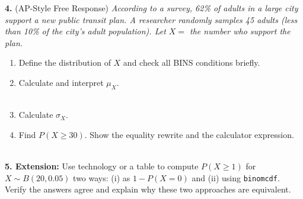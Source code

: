 \documentclass[10pt]{article}
\begin{document}
\begin{practicebox}
\tcbbreak
\vspace{8pt}
\textbf{4.} (AP-Style Free Response) \textit{According to a survey, 62\% of adults in
a large city support a new public transit plan. A researcher randomly samples
45 adults (less than 10\% of the city's adult population).
Let $X =$ the number who support the plan.}
\begin{enumerate}[label=(\alph*), leftmargin=2em, itemsep=8pt]
  \item Define the distribution of $X$ and check all BINS conditions briefly.\\
  \item Calculate and interpret $\mu_X$.\\
        \writeline\gradedhide{\hrulefill}\gradedright{\raisebox{-2pt}{\gradedblank[id=hw4b1, type=short, points=1, answer=27.9, check=numeric, tolerance=0.05]{1.3in}{0.2in}}}\\[6pt]
  \item Calculate $\sigma_X$.\\
        \writeline\gradedhide{\hrulefill}\gradedright{\raisebox{-2pt}{\gradedblank[id=hw4c, type=short, points=1, answer=3.26, check=numeric, tolerance=0.01]{1.3in}{0.2in}}}
  \item Find $P(X \ge 30)$. Show the equality rewrite and the calculator expression.\\
        \writeline\\[1pt]\writeline\gradedhide{\hrulefill}\gradedright{\raisebox{-2pt}{\gradedblank[id=hw4d, type=short, points=2, answer=0.3152, check=numeric, tolerance=0.002]{1.3in}{0.2in}}}
\end{enumerate}

\vspace{8pt}
\textbf{5. Extension:} Use technology or a table to compute $P(X \ge 1)$ for
$X \sim B(20, 0.05)$ two ways: (i) as $1 - P(X = 0)$ and (ii) using
\texttt{binomcdf}. Verify the answers agree and explain why these two approaches
are equivalent.

\vspace{4pt}
\writeline\\[1pt]\writeline\\[1pt]\writeline

\end{practicebox}
\end{document}
